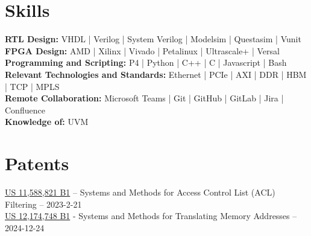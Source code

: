 \documentclass[10pt]{deedy-resume-reversed}
\begin{document}
\begin{minipage}[t]{1.0\textwidth}




\section{Skills}
\textbf{RTL Design:} VHDL | Verilog | System Verilog | Modelsim | Questasim | Vunit \\
\textbf{FPGA Design:} AMD | Xilinx | Vivado | Petalinux | Ultrascale+ | Versal \\
\textbf{Programming and Scripting:} P4 | Python | C++ | C | Javascript | Bash \\
\textbf{Relevant Technologies and Standards:} Ethernet | PCIe | AXI | DDR | HBM | TCP | MPLS \\
\textbf{Remote Collaboration:} Microsoft Teams | Git | GitHub | GitLab | Jira | Confluence \\
\textbf{Knowledge of:} UVM \\
\sectionsep


\section{Patents}
\href{https://image-ppubs.uspto.gov/dirsearch-public/print/downloadPdf/11588821}{US 11,588,821 B1}
– Systems and Methods for Access Control List (ACL) Filtering – 2023-2-21 \\
\href{https://image-ppubs.uspto.gov/dirsearch-public/print/downloadPdf/12174748}{US 12,174,748 B1}
- Systems and Methods for Translating Memory Addresses – 2024-12-24 \\
\sectionsep

\end{minipage}
\end{document}
